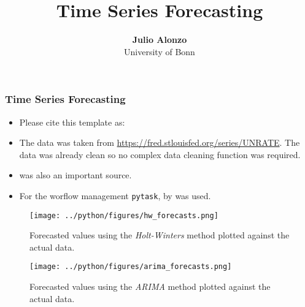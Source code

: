 \documentclass[11pt, aspectratio=169]{beamer}
\begin{document}
\title{Time Series Forecasting}

\author[Julio Alonzo]
{
{\bf Julio Alonzo}\\
{\small University of Bonn}\\[1ex]
}


\begin{frame}
    \titlepage
    \note{~}
\end{frame}


\begin{frame}[t]
    \frametitle{Time Series Forecasting}
    \begin{itemize}
        \item Please cite this template as: \citet{GaudeckerEconProjectTemplates}
        \item The data was taken from \url{https://fred.stlouisfed.org/series/UNRATE}. The data was already clean so no complex data cleaning function was required.
        \item \citet{huang2022applied} was also an important source.
        \item For the worflow management \texttt{pytask}, by \citet{Raabe2020} was used.
    \end{itemize}
    \note{~}
\end{frame}



\begin{frame}[t]
    \begin{figure}[H]

        \centering
        \texttt{[image: ../python/figures/hw\_forecasts.png]}

        \caption{Forecasted values using the \emph{Holt-Winters} method plotted against the actual data.}
        \label{fig:hw}

    \end{figure}
\end{frame}

\begin{frame}[t]
    \begin{figure}[H]

        \centering
        \texttt{[image: ../python/figures/arima\_forecasts.png]}

        \caption{Forecasted values using the \emph{ARIMA} method plotted against the actual data.}
        \label{fig:arima}

    \end{figure}
\end{frame}
\end{document}
